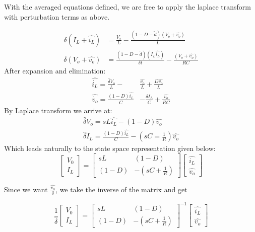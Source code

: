 With the averaged equations defined, we are free to apply the laplace transform with perturbation terms as above.

\begin{equation}
\begin{split}
\delta(I_L + \hat{i_L})& = \frac{V_s}{L} - \frac{(1-D-\tilde{d})(V_o + \hat{v_o})}{L} \\
\delta(V_o + \hat{v_o}) &= \frac{(1-D-\tilde{d})(I_L \hat{i_L})}{\delta t} - \frac{(V_o +\hat{v_o})}{RC}
\end{split}
\end{equation}
After expansion and elimination:
\begin{equation}
\begin{split}
\hat{\dot{i_L}} = \frac{\hat{\delta}V_o}{L} - &\frac{\hat{v_o}}{L} + \frac{D\hat{v_o}}{L}\\
\hat{\dot{v_o}} = \frac{(1-D)\hat{i_L}}{C}& - \frac{\delta I_L}{C} + \frac{\hat{v_o}}{RC}
\end{split}
\end{equation}
By Laplace transform we arrive at:
\begin{equation}
\begin{split}
\hat{\delta}V_o = sL\hat{i_L} - (1-D)\hat{v_o} \\
\hat{\delta}I_L = \frac{(1-D)\hat{i_L}}{C} - (sC = \frac{1}{R})\hat{v_o}
\end{split}
\end{equation}
Which leads naturally to the state space representation given below:
\begin{equation}
\begin{bmatrix}
V_0  \\ I_L 
\end{bmatrix}
 = 
\begin{bmatrix}
sL & (1-D) \\ 
(1-D) & -(sC + \frac{1}{R}) 
\end{bmatrix}
\begin{bmatrix}
\hat{i_L}  \\ \hat{v_o} 
\end{bmatrix}
\end{equation}

Since we want $\frac{\hat{v_o}}{\delta}$, we take the inverse of the matrix and get

\begin{equation}
\frac{1}{\hat{\delta}}\begin{bmatrix}
V_0  \\ I_L 
\end{bmatrix}= 
\begin{bmatrix}
sL & (1-D) \\ 
(1-D) & -(sC + \frac{1}{R}) 
\end{bmatrix}^{-1}
\begin{bmatrix}
\hat{i_L}  \\ \hat{v_o} 
\end{bmatrix}
\end{equation}

